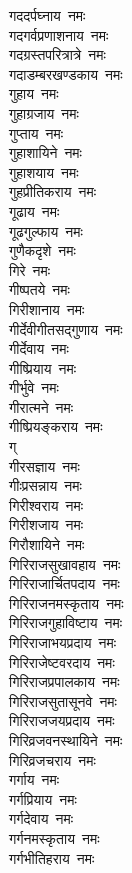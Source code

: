 \begin{multicols}{2}
\begin{flushleft}
गददर्पघ्नाय~नमः\\
गदगर्वप्रणाशनाय~नमः\\
गदग्रस्तपरित्रात्रे~नमः\\
गदाडम्बरखण्डकाय~नमः\hfill{}\\
गुहाय~नमः\\
गुहाग्रजाय~नमः\\
गुप्ताय~नमः\\
गुहाशायिने~नमः\\
गुहाशयाय~नमः\\
गुहप्रीतिकराय~नमः\\
गूढाय~नमः\\
गूढगुल्फाय~नमः\\
गुणैकदृशे~नमः\\
गिरे~नमः\hfill{}\\
गीष्पतये~नमः\\
गिरीशानाय~नमः\\
गीर्देवीगीतसद्गुणाय~नमः\\
गीर्देवाय~नमः\\
गीष्प्रियाय~नमः\\
गीर्भुवे~नमः\\
गीरात्मने~नमः\\
गीष्प्रियङ्कराय~नमः\\
ग्\\
गीरसज्ञाय~नमः\hfill{}\\
गीःप्रसन्नाय~नमः\\
गिरीश्वराय~नमः\\
गिरीशजाय~नमः\\
गिरौशायिने~नमः\\
गिरिराजसुखावहाय~नमः\\
गिरिराजार्चितपदाय~नमः\\
गिरिराजनमस्कृताय~नमः\\
गिरिराजगुहाविष्टाय~नमः\\
गिरिराजाभयप्रदाय~नमः\\
गिरिराजेष्टवरदाय~नमः\hfill{}\\
गिरिराजप्रपालकाय~नमः\\
गिरिराजसुतासूनवे~नमः\\
गिरिराजजयप्रदाय~नमः\\
गिरिव्रजवनस्थायिने~नमः\\
गिरिव्रजचराय~नमः\\
गर्गाय~नमः\\
गर्गप्रियाय~नमः\\
गर्गदेवाय~नमः\\
गर्गनमस्कृताय~नमः\\
गर्गभीतिहराय~नमः\hfill{}\\

\end{flushleft}
\end{multicols}
